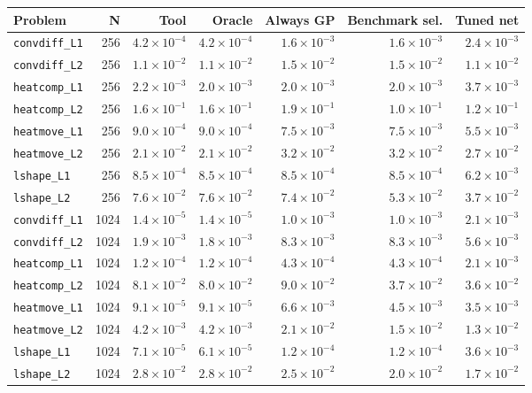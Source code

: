 \begin{tabular}{lrrrrrr}
\toprule
Problem & N & Tool & Oracle & Always GP & Benchmark sel. & Tuned net \\
\midrule
\texttt{convdiff\_L1} & 256 & $4.2\times10^{-4}$ & $4.2\times10^{-4}$ & $1.6\times10^{-3}$ & $1.6\times10^{-3}$ & $2.4\times10^{-3}$ \\
\texttt{convdiff\_L2} & 256 & $1.1\times10^{-2}$ & $1.1\times10^{-2}$ & $1.5\times10^{-2}$ & $1.5\times10^{-2}$ & $1.1\times10^{-2}$ \\
\texttt{heatcomp\_L1} & 256 & $2.2\times10^{-3}$ & $2.0\times10^{-3}$ & $2.0\times10^{-3}$ & $2.0\times10^{-3}$ & $3.7\times10^{-3}$ \\
\texttt{heatcomp\_L2} & 256 & $1.6\times10^{-1}$ & $1.6\times10^{-1}$ & $1.9\times10^{-1}$ & $1.0\times10^{-1}$ & $1.2\times10^{-1}$ \\
\texttt{heatmove\_L1} & 256 & $9.0\times10^{-4}$ & $9.0\times10^{-4}$ & $7.5\times10^{-3}$ & $7.5\times10^{-3}$ & $5.5\times10^{-3}$ \\
\texttt{heatmove\_L2} & 256 & $2.1\times10^{-2}$ & $2.1\times10^{-2}$ & $3.2\times10^{-2}$ & $3.2\times10^{-2}$ & $2.7\times10^{-2}$ \\
\texttt{lshape\_L1} & 256 & $8.5\times10^{-4}$ & $8.5\times10^{-4}$ & $8.5\times10^{-4}$ & $8.5\times10^{-4}$ & $6.2\times10^{-3}$ \\
\texttt{lshape\_L2} & 256 & $7.6\times10^{-2}$ & $7.6\times10^{-2}$ & $7.4\times10^{-2}$ & $5.3\times10^{-2}$ & $3.7\times10^{-2}$ \\
\texttt{convdiff\_L1} & 1024 & $1.4\times10^{-5}$ & $1.4\times10^{-5}$ & $1.0\times10^{-3}$ & $1.0\times10^{-3}$ & $2.1\times10^{-3}$ \\
\texttt{convdiff\_L2} & 1024 & $1.9\times10^{-3}$ & $1.8\times10^{-3}$ & $8.3\times10^{-3}$ & $8.3\times10^{-3}$ & $5.6\times10^{-3}$ \\
\texttt{heatcomp\_L1} & 1024 & $1.2\times10^{-4}$ & $1.2\times10^{-4}$ & $4.3\times10^{-4}$ & $4.3\times10^{-4}$ & $2.1\times10^{-3}$ \\
\texttt{heatcomp\_L2} & 1024 & $8.1\times10^{-2}$ & $8.0\times10^{-2}$ & $9.0\times10^{-2}$ & $3.7\times10^{-2}$ & $3.6\times10^{-2}$ \\
\texttt{heatmove\_L1} & 1024 & $9.1\times10^{-5}$ & $9.1\times10^{-5}$ & $6.6\times10^{-3}$ & $4.5\times10^{-3}$ & $3.5\times10^{-3}$ \\
\texttt{heatmove\_L2} & 1024 & $4.2\times10^{-3}$ & $4.2\times10^{-3}$ & $2.1\times10^{-2}$ & $1.5\times10^{-2}$ & $1.3\times10^{-2}$ \\
\texttt{lshape\_L1} & 1024 & $7.1\times10^{-5}$ & $6.1\times10^{-5}$ & $1.2\times10^{-4}$ & $1.2\times10^{-4}$ & $3.6\times10^{-3}$ \\
\texttt{lshape\_L2} & 1024 & $2.8\times10^{-2}$ & $2.8\times10^{-2}$ & $2.5\times10^{-2}$ & $2.0\times10^{-2}$ & $1.7\times10^{-2}$ \\
\bottomrule
\end{tabular}
